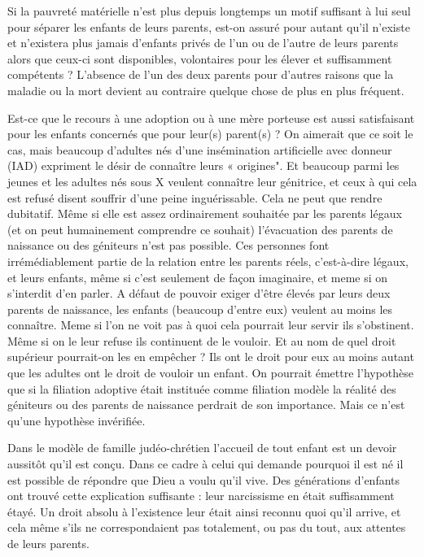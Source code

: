  Si la pauvreté matérielle n'est plus depuis longtemps un motif suffisant à lui seul pour séparer les enfants de leurs parents, est-on assuré pour autant qu'il n'existe et n'existera plus jamais d'enfants privés de l'un ou de l'autre de leurs parents alors que ceux-ci sont disponibles, volontaires pour les élever et suffisamment compétents ? L'absence de l'un des deux parents pour d'autres raisons que la maladie ou la mort devient au contraire quelque chose de plus en plus fréquent. 


 Est-ce que le recours à une adoption ou à une mère porteuse est aussi satisfaisant pour les enfants concernés que pour leur(s) parent(s) ? On aimerait que ce soit le cas, mais beaucoup d'adultes nés d'une insémination artificielle avec donneur (IAD) expriment le désir de connaître leurs « origines". Et beaucoup parmi les jeunes et les adultes nés sous X veulent connaître leur génitrice, et ceux à qui cela est refusé disent souffrir d'une peine inguérissable. Cela ne peut que rendre dubitatif. Même si elle est assez ordinairement souhaitée par les parents légaux (et on peut humainement comprendre ce souhait) l'évacuation des parents de naissance ou des géniteurs n'est pas possible. Ces personnes font irrémédiablement partie de la relation entre les parents réels, c'est-à-dire légaux, et leurs enfants, même si c'est seulement de façon imaginaire, et meme si on s'interdit d'en parler. A défaut de pouvoir exiger d'être élevés par leurs deux parents de naissance, les enfants (beaucoup d'entre eux) veulent au moins les connaître.  Meme si l'on ne voit pas à quoi cela pourrait leur servir ils s'obstinent. Même si on le leur refuse ils continuent de le vouloir. Et au nom de quel droit supérieur pourrait-on les en empêcher ? Ils ont le droit pour eux au moins autant que les adultes ont le droit de vouloir un enfant. On pourrait émettre l'hypothèse que si la filiation adoptive était instituée comme filiation modèle la réalité des géniteurs ou des parents de naissance perdrait de son importance. Mais ce n'est qu'une hypothèse invérifiée.
 
 Dans le modèle de famille judéo-chrétien  l'accueil de tout enfant est un devoir aussitôt qu'il est conçu. Dans ce cadre à celui qui demande pourquoi il est né il est possible de répondre que Dieu a voulu qu'il vive. Des générations d'enfants ont trouvé cette explication suffisante : leur narcissisme en était suffisamment étayé. Un droit absolu à l'existence leur était ainsi reconnu quoi qu'il arrive, et cela même s'ils ne correspondaient pas totalement, ou pas du tout, aux attentes de leurs parents.
  

